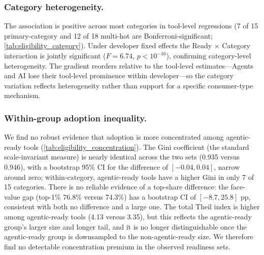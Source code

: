 \subsubsection{Category heterogeneity.}

The association is positive across most categories in tool-level regressions
(7 of 15 primary-category and 12 of 18 multi-hot are Bonferroni-significant;
\autoref{tab:eligibility_category}). Under developer fixed effects the Ready $\times$ Category interaction is jointly
significant ($F = 6.74$, $p < 10^{-16}$), confirming category-level heterogeneity.
The gradient reorders relative to the tool-level estimates---Agents and AI lose their tool-level
prominence within developer---so the category variation reflects heterogeneity
rather than support for a specific consumer-type mechanism.



\subsubsection{Within-group adoption inequality.}

We find no robust evidence that adoption is more concentrated among
agentic-ready tools (\autoref{tab:eligibility_concentration}). The Gini
coefficient (the standard scale-invariant measure) is nearly identical across
the two sets (0.935 versus 0.946), with a bootstrap 95\% CI for the difference
of $[-0.04, 0.04]$, narrow around zero; within-category, agentic-ready tools
have a higher Gini in only 7 of 15 categories. There is no reliable evidence of a top-share difference: the face-value gap
(top-1\% 76.8\% versus 74.3\%) has a bootstrap CI of $[-8.7, 25.8]$ pp, consistent with
both no difference and a large one. The total Theil index is higher among
agentic-ready tools (4.13 versus 3.35), but this reflects the agentic-ready
group's larger size and longer tail, and it is no longer distinguishable once
the agentic-ready group is downsampled to the non-agentic-ready size. We
therefore find no detectable concentration premium in the observed readiness
sets.


